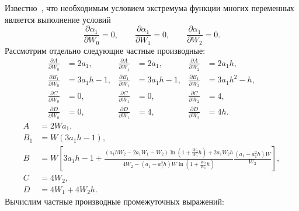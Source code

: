 \documentclass[a4paper,14pt]{article}
\begin{document}
Известно~\cite[стр.~469]{fihtengolc2003}, что необходимым условием
экстремума функции многих переменных является выполнение условий
\begin{equation*}
  \frac{\partial \alpha_1}{\partial W_0} = 0,
  \qquad
  \frac{\partial \alpha_1}{\partial W_1} = 0,
  \qquad
  \frac{\partial \alpha_1}{\partial W_2} = 0.
\end{equation*}
Рассмотрим отдельно следующие частные производные:
\begin{equation*}
  \begin{aligned}
    \frac{\partial A}{\partial W_0}
    &=
      2 a_1,
    &
      \frac{\partial A}{\partial W_1}
    &=
      2 a_1,
    &
      \frac{\partial A}{\partial W_2}
    &=
      2 a_1 h, \\
    \frac{\partial B_1}{\partial W_0}
    &=
      3 a_1 h - 1,
    &
      \frac{\partial B_1}{\partial W_1}
    &=
      3 a_1 h - 1,
    &
      \frac{\partial B_1}{\partial W_2}
    &=
      3 a_1 h^2 - h, \\
    \frac{\partial C}{\partial W_0}
    &=
      0,
    &
      \frac{\partial C}{\partial W_1}
    &=
      0,
    &
      \frac{\partial C}{\partial W_2}
    &=
      4, \\
    \frac{\partial D}{\partial W_0}
    &=
      0,
    &
      \frac{\partial D}{\partial W_1}
    &=
      4,
    &
      \frac{\partial D}{\partial W_2}
    &=
      4 h.
  \end{aligned}
\end{equation*}
\begin{equation*}
  \begin{aligned}
    A
    &=
      2 W a_1, \\
    B_1 &= W (3 a_1 h - 1), \\
    B
    &=
      W
      \left[
      3 a_1 h - 1
      +
      \frac{
      \left(a_1 h W_2 - 2 a_1 W_1 - W_2 \right)
      \ln \left( 1 +  \frac{W_2}{W_1} h \right)
      + 2 a_1 W_2 h
      }{4 W_2 - (a_1 - a_1^2 h) W
      \ln \left( 1 + \frac{W_2}{W_1} h \right)
      }
      \frac{(a_1 - a_1^2 h) W}{W_2}
      \right], \\
    C
    &=
      4 W_2, \\
    D
    &=
      4 W_1 + 4 W_2 h.
  \end{aligned}
\end{equation*}
Вычислим частные производные промежуточных выражений:
\end{document}
